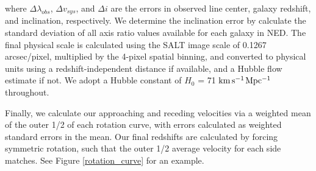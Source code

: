 \documentclass[iop]{emulateapj-rtx4}
\newcommand{\kms}{$\rm km\, s^{-1}$}
\begin{document}
\noindent where $\Delta \lambda_{obs}$, $\Delta v_{sys}$, and $\Delta i$ are the errors in observed line center, galaxy redshift, and inclination, respectively. We determine the inclination error by calculate the standard deviation of all axis ratio values available for each galaxy in NED. The final physical scale is calculated using the SALT image scale of 0.1267 arcsec/pixel, multiplied by the 4-pixel spatial binning, and converted to physical units using a redshift-independent distance if available, and a Hubble flow estimate if not. We adopt a Hubble constant of $H_0$ = 71 \kms $\rm Mpc^{-1}$ throughout.

Finally, we calculate our approaching and receding velocities via a weighted mean of the outer 1/2 of each rotation curve, with errors calculated as weighted standard errors in the mean. Our final redshifts are calculated by forcing symmetric rotation, such that the outer 1/2 average velocity for each side matches. See Figure \ref{rotation_curve} for an example.

\end{document}
